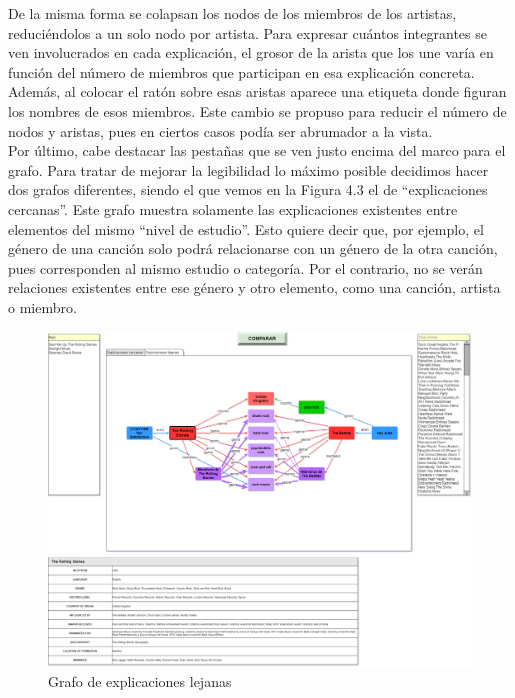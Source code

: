 De la misma forma se colapsan los nodos de los miembros de los artistas, reduciéndolos a un solo nodo por artista. Para expresar cuántos integrantes se ven involucrados en cada explicación, el grosor de la arista que los une varía en función del número de miembros que participan en esa explicación concreta. Además, al colocar el ratón sobre esas aristas aparece una etiqueta donde figuran los nombres de esos miembros. Este cambio se propuso para reducir el número de nodos y aristas, pues en ciertos casos podía ser abrumador a la vista.\\

Por último, cabe destacar las pestañas que se ven justo encima del marco para el grafo. Para tratar de mejorar la legibilidad lo máximo posible decidimos hacer dos grafos diferentes, siendo el que vemos en la Figura 4.3 el de ``explicaciones cercanas''. Este grafo muestra solamente las explicaciones existentes entre elementos del mismo ``nivel de estudio''. Esto quiere decir que, por ejemplo, el género de una canción solo podrá relacionarse con un género de la otra canción, pues corresponden al mismo estudio o categoría. Por el contrario, no se verán relaciones existentes entre ese género y otro elemento, como una canción, artista o miembro.\\

\begin{figure}[h!]
	\centering
	\includegraphics[width = 1\textwidth]{Imagenes/Bitmap/Tercera Interfaz (Alternativa).png}
	\caption{Grafo de explicaciones lejanas}
	\label{fig:sampleImage}
\end{figure}

